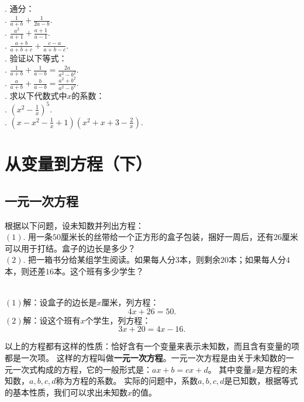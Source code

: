 \documentclass[12pt,UTF8,fontset=none]{ctexbook}
\begin{document}
\begin{xt}\label{xt:5-1-0}
    \mbox{}\\
    . 通分：\\
    . $\frac{1}{a+b} + \frac{1}{2a-b}.$\\  %
    . $\frac{a^2}{a+1} + \frac{a+1}{a-1}.$\\  %
    . $\frac{a+b}{a+b+c} + \frac{c-a}{a+b-c}.$\\  %
    . 验证以下等式：\\
    . $\frac{1}{a+b} + \frac{1}{a-b} = \frac{2a}{a^2-b^2}.$\\
    . $\frac{a}{a+b} + \frac{b}{a-b} = \frac{a^2+b^2}{a^2-b^2}.$\\
    . 求以下代数式中$x$的系数：\\
    . $(x^2 - \frac{1}{x})^5.$\\  %
    . $(x - x^2 - \frac{1}{x} + 1)(x^2 + x + 3 - \frac{2}{x}).$ %
\end{xt}

\chapter{从变量到方程（下）}

\section{一元一次方程}

\begin{ex}\label{ex:4-0-0}
    根据以下问题，设未知数并列出方程：\\
    $(1).$ 用一条$50$厘米长的丝带给一个正方形的盒子包装，捆好一周后，还有$26$厘米可以用于打结。盒子的边长是多少？\\
    $(2).$ 把一箱书分给某组学生阅读。如果每人分$3$本，则剩余$20$本；如果每人分$4$本，则还差$16$本。这个班有多少学生？
\end{ex}
\begin{so}
    \mbox{} \\
    $(1)$解：设盒子的边长是$x$厘米，列方程：
    $$ 4x + 26 = 50.$$
    $(2)$解：设这个班有$x$个学生，列方程：
    $$ 3x + 20 = 4x - 16.$$
\end{so}
以上的方程都有这样的性质：恰好含有一个变量来表示未知数，而且含有变量的项都是一次项。
这样的方程叫做\textbf{一元一次方程}。一元一次方程是由关于未知数的一元一次式构成的方程，它的一般形式是：$ax+b=cx+d$。
其中变量$x$是方程的未知数，$a,b,c,d$称为方程的系数。
实际的问题中，系数$a,b,c,d$是已知数，根据等式的基本性质，我们可以求出未知数$x$的值。
\end{document}
